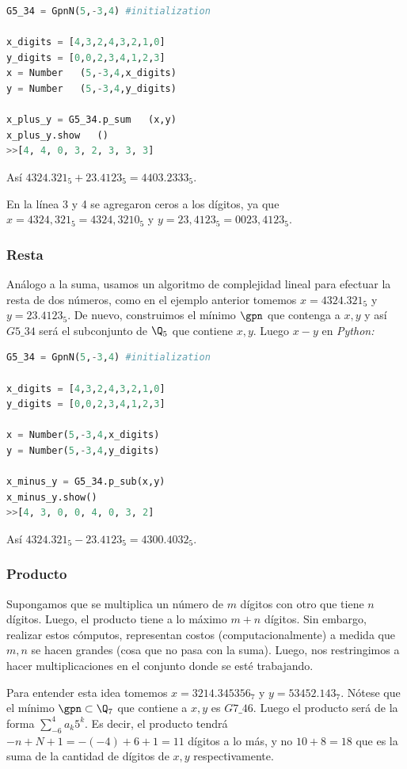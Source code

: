 \begin{lstlisting}[language = Python, caption = suma de números en $\mathit{G5\_34}$]
G5_34 = GpnN(5,-3,4) #initialization

x_digits = [4,3,2,4,3,2,1,0]
y_digits = [0,0,2,3,4,1,2,3]
x = Number   (5,-3,4,x_digits)
y = Number   (5,-3,4,y_digits)

x_plus_y = G5_34.p_sum   (x,y)
x_plus_y.show   ()
>>[4, 4, 0, 3, 2, 3, 3, 3]

\end{lstlisting}
Así $ 4324.321_5+23.4123_5=4403.2333_5$.
\begin{remark}
	En la línea 3 y 4 se agregaron ceros a los dígitos, ya que ${x=4324,321_5 = 4324,3210_5}$ y ${y=23,4123_5 =0023,4123_5}.$
\end{remark}

\subsubsection{Resta}
Análogo a la suma, usamos un algoritmo de complejidad lineal para efectuar la resta de dos números, como en el ejemplo anterior tomemos ${x =4324.321_5}$ y ${y=23.4123_5}$. De nuevo, construimos el mínimo $\gpn$ que contenga a $x,y$ y así  $\mathit{G5\_{3}4}$ será el subconjunto de $\Q_5$ que contiene $x,y$. Luego $x-y$ en \textit{Python:}


\begin{lstlisting}[language = Python, caption = resta de números en $\mathit{G5\_34}$]
G5_34 = GpnN(5,-3,4) #initialization

x_digits = [4,3,2,4,3,2,1,0]
y_digits = [0,0,2,3,4,1,2,3]

x = Number(5,-3,4,x_digits)
y = Number(5,-3,4,y_digits)

x_minus_y = G5_34.p_sub(x,y)
x_minus_y.show()
>>[4, 3, 0, 0, 4, 0, 3, 2]

\end{lstlisting}
Así $ 4324.321_5-23.4123_5=4300.4032_5$.

\subsubsection{Producto}
\begin{remark}
	\label{producto}    
	Supongamos que se multiplica un número de $m$  dígitos con otro que tiene $n$  dígitos. Luego, el producto tiene a lo máximo $m+n$ dígitos. Sin embargo, realizar estos cómputos, representan costos   (computacionalmente) a medida que $m,n$ se hacen grandes   (cosa que no pasa con la suma). Luego, nos restringimos a hacer multiplicaciones en el conjunto donde se esté trabajando.
	
	Para entender esta idea tomemos $x=3214.345356_7$ y $y = 53452.143_7$. Nótese que el mínimo $\gpn\subset\Q_7$ que contiene a $x,y$ es $\mathit{G7\_{4}6}$. Luego el producto será de la forma $\sum_{-6}^{4}a_k5^k$. Es decir, el producto tendrá \linebreak$-n+N+1=-   (-4)+6+1=11$ dígitos a lo más, y no $10+8=18$ que es la suma de la cantidad de dígitos de $x,y$ respectivamente.
\end{remark}


